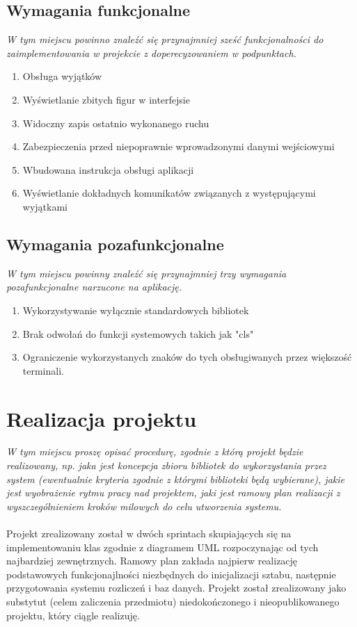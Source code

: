 \documentclass{article}
\begin{document}
\subsection{Wymagania funkcjonalne}
{\small\it W tym miejscu powinno znaleźć się przynajmniej sześć funkcjonalności do zaimplementowania w projekcie z doperecyzowaniem w podpunktach.}
\begin{enumerate}
  \item Obsługa wyjątków
  \item Wyświetlanie zbitych figur w interfejsie
  \item Widoczny zapis ostatnio wykonanego ruchu
  \item Zabezpieczenia przed niepoprawnie wprowadzonymi danymi wejściowymi
  \item Wbudowana instrukcja obsługi aplikacji
  \item Wyświetlanie dokładnych komunikatów związanych z występującymi wyjątkami
\end{enumerate}
\subsection{Wymagania pozafunkcjonalne}
{\small\it W tym miejscu powinny znaleźć się przynajmniej trzy wymagania pozafunkcjonalne narzucone na aplikację.}
\begin{enumerate}
  \item Wykorzystywanie wyłącznie standardowych bibliotek
  \item Brak odwołań do funkcji systemowych takich jak "cls"
  \item Ograniczenie wykorzystanych znaków do tych obsługiwanych przez większość terminali.
\end{enumerate}
\section{Realizacja projektu}
 {\small\it W tym miejscu proszę opisać procedurę, zgodnie z którą projekt będzie realizowany, np. jaka jest koncepcja zbioru bibliotek do wykorzystania przez system (ewentualnie kryteria zgodnie z którymi biblioteki będą wybierane), jakie jest wyobrażenie rytmu pracy nad projektem, jaki jest ramowy plan realizacji z wyszczególnieniem kroków milowych do celu utworzenia systemu.}
\\ \\
\textup{Projekt zrealizowany został w dwóch sprintach skupiających się na implementowaniu klas zgodnie z diagramem UML rozpoczynając od tych najbardziej zewnętrznych.  Ramowy plan zakłada najpierw realizację podstawowych funkcjonajlności niezbędnych do inicjalizacji sztabu, następnie przygotowania systemu rozliczeń i baz danych. Projekt został zrealizowany jako substytut (celem zaliczenia przedmiotu) niedokończonego i nieopublikowanego projektu, który ciągle realizuję.}
\end{document}
